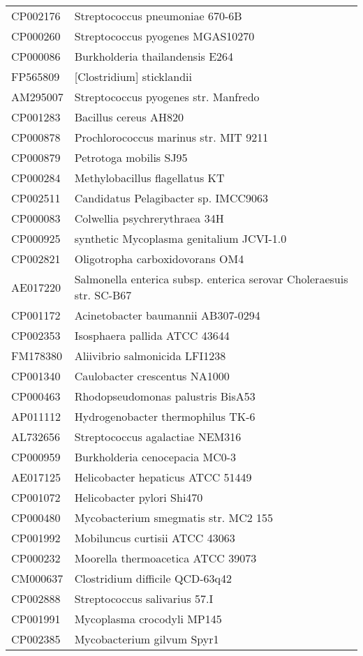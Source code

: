 \begin{longtable}{ll}
CP002176 & Streptococcus pneumoniae 670-6B\\
CP000260 & Streptococcus pyogenes MGAS10270\\
CP000086 & Burkholderia thailandensis E264\\
FP565809 & [Clostridium] sticklandii\\
AM295007 & Streptococcus pyogenes str. Manfredo\\
CP001283 & Bacillus cereus AH820\\
CP000878 & Prochlorococcus marinus str. MIT 9211\\
CP000879 & Petrotoga mobilis SJ95\\
CP000284 & Methylobacillus flagellatus KT\\
CP002511 & Candidatus Pelagibacter sp. IMCC9063\\
CP000083 & Colwellia psychrerythraea 34H\\
CP000925 & synthetic Mycoplasma genitalium JCVI-1.0\\
CP002821 & Oligotropha carboxidovorans OM4\\
AE017220 & Salmonella enterica subsp. enterica serovar Choleraesuis str. SC-B67\\
CP001172 & Acinetobacter baumannii AB307-0294\\
CP002353 & Isosphaera pallida ATCC 43644\\
FM178380 & Aliivibrio salmonicida LFI1238\\
CP001340 & Caulobacter crescentus NA1000\\
CP000463 & Rhodopseudomonas palustris BisA53\\
AP011112 & Hydrogenobacter thermophilus TK-6\\
AL732656 & Streptococcus agalactiae NEM316\\
CP000959 & Burkholderia cenocepacia MC0-3\\
AE017125 & Helicobacter hepaticus ATCC 51449\\
CP001072 & Helicobacter pylori Shi470\\
CP000480 & Mycobacterium smegmatis str. MC2 155\\
CP001992 & Mobiluncus curtisii ATCC 43063\\
CP000232 & Moorella thermoacetica ATCC 39073\\
CM000637 & Clostridium difficile QCD-63q42\\
CP002888 & Streptococcus salivarius 57.I\\
CP001991 & Mycoplasma crocodyli MP145\\
CP002385 & Mycobacterium gilvum Spyr1\\

\end{longtable}
